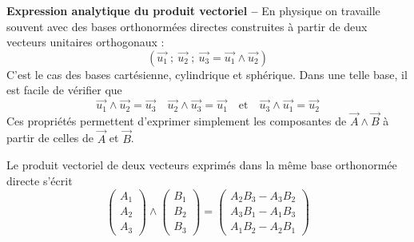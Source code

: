 \textbf{Expression analytique du produit vectoriel -- } En physique on travaille souvent avec des bases orthonormées directes construites à partir de deux vecteurs unitaires orthogonaux : 
\[
(\overrightarrow{u_1}~;~\overrightarrow{u_2}~;~\overrightarrow{u_3}=\overrightarrow{u_1}\wedge \overrightarrow{u_2})
\]
C'est le cas des bases cartésienne, cylindrique et sphérique. Dans une telle base, il est facile de vérifier que 
\begin{equation}
	\overrightarrow{u_1}\wedge \overrightarrow{u_2}=\overrightarrow{u_3}
	\quad
	\overrightarrow{u_2}\wedge \overrightarrow{u_3}=\overrightarrow{u_1}
	\quad\text{et}\quad
	\overrightarrow{u_3}\wedge \overrightarrow{u_1}=\overrightarrow{u_2}
	\label{eq:vecteurs4}
\end{equation}
Ces propriétés permettent d'exprimer simplement les composantes de $\overrightarrow{A}\wedge \overrightarrow{B}$ à partir de celles de $\overrightarrow{A}$ et $\overrightarrow{B}$. 
\begin{kaobox}[frametitle=Expression du produit vectoriel]
Le produit vectoriel de deux vecteurs exprimés dans la même base orthonormée directe s'écrit  
	\[
		\begin{pmatrix}A_1\\A_2\\A_3\end{pmatrix}
		\wedge
		\begin{pmatrix}B_1\\B_2\\B_3\end{pmatrix}
			=
		\begin{pmatrix}A_2B_3-A_3B_2\\A_3B_1-A_1B_3\\A_1B_2-A_2B_1\end{pmatrix}			
	\]

\end{kaobox} 

